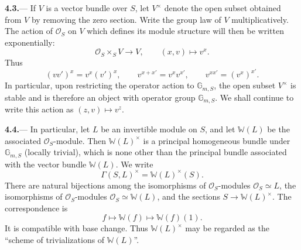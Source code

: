 \par\medskip\noindent
\textbf{4.3.}---
If \(V\) is a vector bundle over \(S\), let \(V^\times\) denote the
open subset obtained from \(V\) by removing the zero section.  Write
the group law of \(V\) multiplicatively.  The action of
\(\mathcal O_S\) on \(V\) which defines its module structure will
then be written exponentially:
\[
  \mathcal O_S\times_S V\longrightarrow V,
  \qquad
  (x,v)\longmapsto v^x.
\]
Thus
\[
  (vv')^x=v^x(v')^x,
  \qquad
  v^{x+x'}=v^xv^{x'},
  \qquad
  v^{xx'}=(v^x)^{x'}.
\]
In particular, upon restricting the operator action to
\(\mathbb G_{m,S}\), the open subset \(V^\times\) is stable and is
therefore an object with operator group \(\mathbb G_{m,S}\).  We
shall continue to write this action as
\((z,v)\longmapsto v^z\).

\par\medskip\noindent
{}\textbf{4.4.}---
In particular, let \(L\) be an invertible module on \(S\), and let
\(\mathbb W(L)\) be the associated \(\mathcal O_S\)-module.  Then
\(\mathbb W(L)^\times\) is a principal homogeneous bundle under
\(\mathbb G_{m,S}\) \textup{(locally trivial)}, which is none other than the
principal bundle associated with the vector bundle \(\mathbb W(L)\).  We
write
\[
  \Gamma(S,L)^\times=\mathbb W(L)^\times(S).
\]
There are natural bijections among the isomorphisms of
\(\mathcal O_S\)-modules
\(\mathcal O_S\simeq L\), the isomorphisms of
\(\mathcal O_S\)-modules
\(\mathcal O_S\simeq\mathbb W(L)\), and the
sections \(S\to\mathbb W(L)^\times\).  The correspondence is
\[
  f\longmapsto\mathbb W(f)\longmapsto\mathbb W(f)(1).
\]
It is compatible with base change.  Thus
\(\mathbb W(L)^\times\) may be regarded as the ``scheme of
trivializations of \(\mathbb W(L)\)''.

